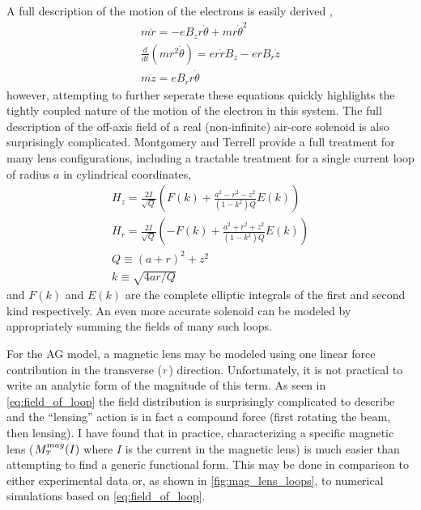 A full description of the motion of the electrons is easily derived \cite{el-kareh_electron_1970},
\begin{subequations} \label{eq:lens_eq_of_motion}
\begin{gather}
  m \ddot{r} = -e B_z r \dot{\theta} + m r \dot{\theta}^2                 \\
  \frac{d}{dt} ( m r^2 \dot{\theta} ) = e r \dot{r} B_z - e r B_r \dot{z} \\
  m \ddot{z} = e B_r r \dot{\theta}
\end{gather}
\end{subequations}
however, attempting to further seperate these equations quickly highlights the tightly coupled nature of the motion of the electron in this system.
The full description of the off-axis field of a real (non-infinite) air-core solenoid is also surprisingly complicated.
Montgomery and Terrell \cite{montgomery_some_1961} provide a full treatment for many lens configurations, including a tractable treatment for a single current loop of radius $a$ in cylindrical coordinates, 
\begin{subequations} \label{eq:field_of_loop}
\begin{gather}
  H_z = \frac{2I}{\sqrt{Q}} \left(   F(k) + \frac{ a^2 - r^2 - z^2 }{ (1-k^2) Q } E(k) \right) \\
  H_r = \frac{2I}{\sqrt{Q}} \left( - F(k) + \frac{ a^2 + r^2 + z^2 }{ (1-k^2) Q } E(k) \right) \\
  Q \equiv (a+r)^2 + z^2 \\
  k \equiv \sqrt{ 4 a r / Q }
\end{gather}
\end{subequations}
and $F(k)$ and $E(k)$ are the complete elliptic integrals of the first and second kind respectively.
An even more accurate solenoid can be modeled by appropriately summing the fields of many such loops.

For the AG model, a magnetic lens may be modeled using one linear force contribution in the transverse ($ {\scriptscriptstyle T} $) direction.
Unfortunately, it is not practical to write an analytic form of the magnitude of this term.
As seen in \ref{eq:field_of_loop} the field distribution is surprisingly complicated to describe and the ``lensing'' action is in fact a compound force (first rotating the beam, then lensing).
I have found that in practice, characterizing a specific magnetic lens ($M_{{\scriptscriptstyle T}}^{mag}(I)$ where $I$ is the current in the magnetic lens) is much easier than attempting to find a generic functional form.
This may be done in comparison to either experimental data or, as shown in \ref{fig:mag_lens_loops}, to numerical simulations based on \ref{eq:field_of_loop}.


